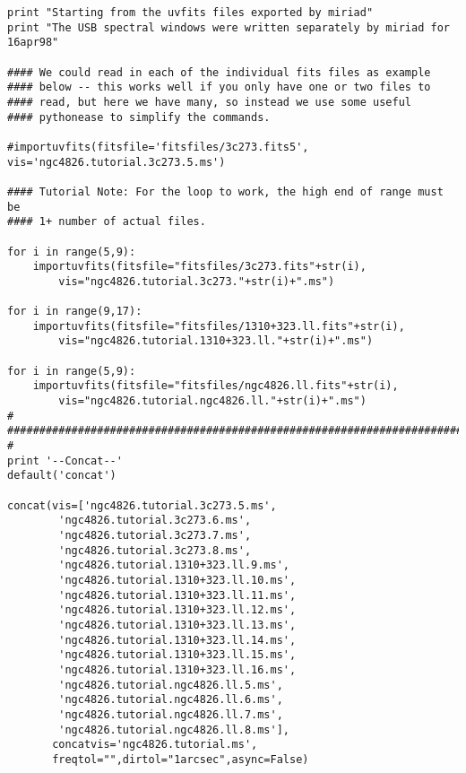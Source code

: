 \begin{verbatim}
print "Starting from the uvfits files exported by miriad"
print "The USB spectral windows were written separately by miriad for 16apr98"

#### We could read in each of the individual fits files as example
#### below -- this works well if you only have one or two files to
#### read, but here we have many, so instead we use some useful
#### pythonease to simplify the commands.

#importuvfits(fitsfile='fitsfiles/3c273.fits5', vis='ngc4826.tutorial.3c273.5.ms')

#### Tutorial Note: For the loop to work, the high end of range must be
#### 1+ number of actual files.

for i in range(5,9):
	importuvfits(fitsfile="fitsfiles/3c273.fits"+str(i),
		vis="ngc4826.tutorial.3c273."+str(i)+".ms")

for i in range(9,17):
	importuvfits(fitsfile="fitsfiles/1310+323.ll.fits"+str(i),
		vis="ngc4826.tutorial.1310+323.ll."+str(i)+".ms")

for i in range(5,9):
	importuvfits(fitsfile="fitsfiles/ngc4826.ll.fits"+str(i),
		vis="ngc4826.tutorial.ngc4826.ll."+str(i)+".ms")
#
##########################################################################
#
print '--Concat--'
default('concat')

concat(vis=['ngc4826.tutorial.3c273.5.ms',
	    'ngc4826.tutorial.3c273.6.ms',
	    'ngc4826.tutorial.3c273.7.ms',
	    'ngc4826.tutorial.3c273.8.ms',
	    'ngc4826.tutorial.1310+323.ll.9.ms',
	    'ngc4826.tutorial.1310+323.ll.10.ms',
	    'ngc4826.tutorial.1310+323.ll.11.ms',
	    'ngc4826.tutorial.1310+323.ll.12.ms',
	    'ngc4826.tutorial.1310+323.ll.13.ms',
	    'ngc4826.tutorial.1310+323.ll.14.ms',
	    'ngc4826.tutorial.1310+323.ll.15.ms',
	    'ngc4826.tutorial.1310+323.ll.16.ms',
	    'ngc4826.tutorial.ngc4826.ll.5.ms',
	    'ngc4826.tutorial.ngc4826.ll.6.ms',
	    'ngc4826.tutorial.ngc4826.ll.7.ms',
	    'ngc4826.tutorial.ngc4826.ll.8.ms'],
       concatvis='ngc4826.tutorial.ms',
       freqtol="",dirtol="1arcsec",async=False)


\end{verbatim}
